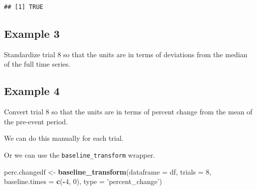 \documentclass[
]{book}
\newenvironment{Shaded}{\begin{snugshade}}{\end{snugshade}}
\newcommand{\CommentTok}[1]{\textcolor[rgb]{0.56,0.35,0.01}{\textit{#1}}}
\newcommand{\DataTypeTok}[1]{\textcolor[rgb]{0.13,0.29,0.53}{#1}}
\newcommand{\DecValTok}[1]{\textcolor[rgb]{0.00,0.00,0.81}{#1}}
\newcommand{\KeywordTok}[1]{\textcolor[rgb]{0.13,0.29,0.53}{\textbf{#1}}}
\newcommand{\NormalTok}[1]{#1}
\newcommand{\OperatorTok}[1]{\textcolor[rgb]{0.81,0.36,0.00}{\textbf{#1}}}
\newcommand{\StringTok}[1]{\textcolor[rgb]{0.31,0.60,0.02}{#1}}
\begin{document}
\begin{verbatim}
## [1] TRUE
\end{verbatim}

\hypertarget{stand-examples-ex3}{%
\subsection{Example 3}\label{stand-examples-ex3}}

Standardize trial 8 so that the units are in terms of deviations from the median of the full time series.

\begin{Shaded}
\end{Shaded}

\hypertarget{stand-examples-ex4}{%
\subsection{Example 4}\label{stand-examples-ex4}}

Convert trial 8 so that the units are in terms of percent change from the mean of the pre-event period.

We can do this manually for each trial.

\begin{Shaded}
\end{Shaded}

Or we can use the \texttt{baseline\_transform} wrapper.

\begin{Shaded}
\begin{Highlighting}[]
\NormalTok{perc.changedf <-}\StringTok{ }\KeywordTok{baseline_transform}\NormalTok{(}\DataTypeTok{dataframe =}\NormalTok{ df,}
                                    \DataTypeTok{trials =} \DecValTok{8}\NormalTok{,}
                                    \DataTypeTok{baseline.times =} \KeywordTok{c}\NormalTok{(}\OperatorTok{-}\DecValTok{4}\NormalTok{, }\DecValTok{0}\NormalTok{),}
                                    \DataTypeTok{type =} \StringTok{'percent_change'}\NormalTok{)}
\end{Highlighting}
\end{Shaded}
\end{document}
